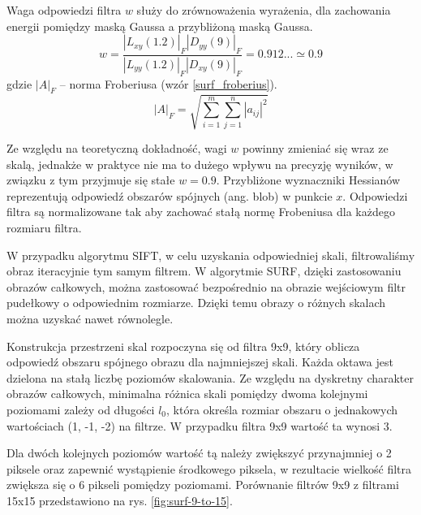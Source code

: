 Waga odpowiedzi filtra $w$ służy do zrównoważenia wyrażenia, dla zachowania energii pomiędzy maską Gaussa a przybliżoną maską Gaussa.
\begin{equation} 
\label{surf_hessian_approx_w}
w = \frac{|L_{xy}(1.2)|_F |D_{yy}(9)|_F}{|L_{yy}(1.2)|_F |D_{xy}(9)|_F} = 0.912... \simeq 0.9
\end{equation} gdzie $|A|_F$ -- norma Froberiusa (wzór \ref{surf_froberius}).
\begin{equation} 
\label{surf_froberius}
|A|_F = \sqrt{\sum\limits_{i=1}^m \sum\limits_{j=1}^n |a_{ij}|^2}
\end{equation}

Ze względu na teoretyczną dokładność, wagi $w$ powinny zmieniać się wraz ze skalą, jednakże w praktyce nie ma to dużego wpływu na precyzję wyników, w związku z tym przyjmuje się stałe $w = 0.9$. Przybliżone wyznaczniki Hessianów reprezentują odpowiedź obszarów spójnych ({ang. blob}) w punkcie $x$. Odpowiedzi filtra są normalizowane tak aby zachować stałą normę Frobeniusa dla każdego rozmiaru filtra.

W przypadku algorytmu SIFT, w celu uzyskania odpowiedniej skali, filtrowaliśmy obraz iteracyjnie tym samym filtrem. W algorytmie SURF, dzięki zastosowaniu obrazów całkowych, można zastosować bezpośrednio na obrazie wejściowym filtr pudełkowy o odpowiednim rozmiarze. Dzięki temu obrazy o różnych skalach można uzyskać nawet równolegle. 

Konstrukcja przestrzeni skal rozpoczyna się od filtra 9x9, który oblicza odpowiedź obszaru spójnego obrazu dla najmniejszej skali. Każda oktawa jest dzielona na stałą liczbę poziomów skalowania. Ze względu na dyskretny charakter obrazów całkowych, minimalna różnica skali pomiędzy dwoma kolejnymi poziomami zależy od długości $l_0$, która określa rozmiar obszaru o jednakowych wartościach (1, -1, -2) na filtrze. W przypadku filtra 9x9 wartość ta wynosi 3.

Dla dwóch kolejnych poziomów wartość tą należy zwiększyć przynajmniej o 2 piksele oraz zapewnić wystąpienie środkowego piksela, w rezultacie wielkość filtra zwiększa się o 6 pikseli pomiędzy poziomami. Porównanie filtrów 9x9 z filtrami 15x15 przedstawiono na rys. \ref{fig:surf-9-to-15}.

